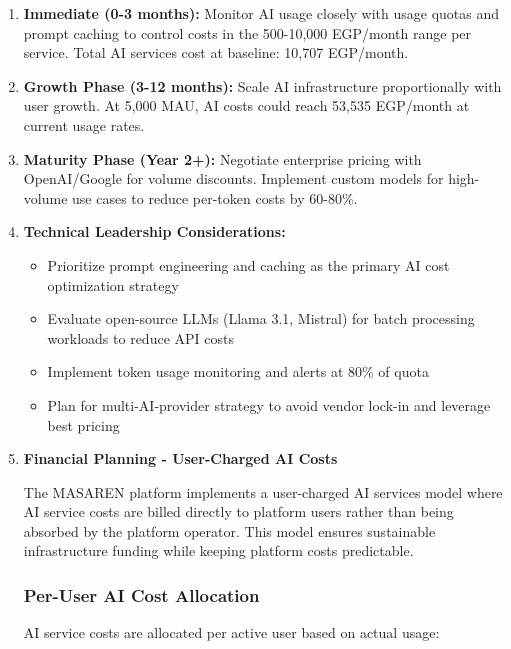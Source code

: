 \documentclass[11pt,a4paper]{article}
\begin{document}
\begin{enumerate}
    \item \textbf{Immediate (0-3 months):} Monitor AI usage closely with usage quotas and prompt caching to control costs in the 500-10,000 EGP/month range per service. Total AI services cost at baseline: 10,707 EGP/month.
    
    \item \textbf{Growth Phase (3-12 months):} Scale AI infrastructure proportionally with user growth. At 5,000 MAU, AI costs could reach 53,535 EGP/month at current usage rates.
    
    \item \textbf{Maturity Phase (Year 2+):} Negotiate enterprise pricing with OpenAI/Google for volume discounts. Implement custom models for high-volume use cases to reduce per-token costs by 60-80\%.
    
    \item \textbf{Technical Leadership Considerations:}
    \begin{itemize}
        \item Prioritize prompt engineering and caching as the primary AI cost optimization strategy
        \item Evaluate open-source LLMs (Llama 3.1, Mistral) for batch processing workloads to reduce API costs
        \item Implement token usage monitoring and alerts at 80\% of quota
        \item Plan for multi-AI-provider strategy to avoid vendor lock-in and leverage best pricing
    \end{itemize}
    
    \item \textbf{Financial Planning - User-Charged AI Costs}

The MASAREN platform implements a user-charged AI services model where AI service costs are billed directly to platform users rather than being absorbed by the platform operator. This model ensures sustainable infrastructure funding while keeping platform costs predictable.

\subsubsection{Per-User AI Cost Allocation}

AI service costs are allocated per active user based on actual usage:


\end{enumerate}
\end{document}
